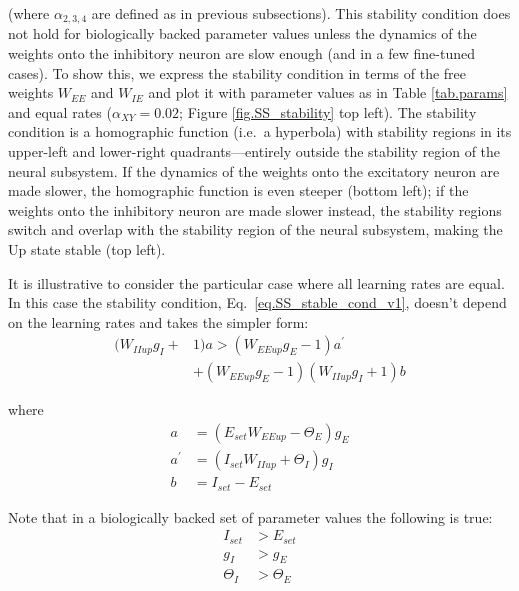 \documentclass[twocolumn]{article}
\newcommand{\EE}{\mathit{EE}}
\newcommand{\IE}{\mathit{IE}}
\newcommand{\II}{\mathit{II}}
\newcommand{\XY}{\mathit{XY}}
\newcommand{\set}{\mathit{set}}
\newcommand{\up}{\mathit{up}}
\begin{document}
\noindent (where $\alpha_{2,3,4}$ are defined as in previous subsections). This stability condition does not hold for biologically backed parameter values unless the dynamics of the weights onto the inhibitory neuron are slow enough (and in a few fine-tuned cases). To show this, we express the stability condition in terms of the free weights $W_{\EE}$ and $W_{\IE}$ and plot it with parameter values as in Table \ref{tab.params} and equal rates ($\alpha_{\XY}=0.02$; Figure \ref{fig.SS_stability} top left). The stability condition is a homographic function (i.e.\ a hyperbola) with stability regions in its upper-left and lower-right quadrants---entirely outside the stability region of the neural subsystem. If the dynamics of the weights onto the excitatory neuron are made slower, the homographic function is even steeper (bottom left); if the weights onto the inhibitory neuron are made slower instead, the stability regions switch and overlap with the stability region of the neural subsystem, making the Up state stable (top left).

It is illustrative to consider the particular case where all learning rates are equal. In this case the stability condition, Eq.\ \ref{eq.SS_stable_cond_v1}, doesn't depend on the learning rates and takes the simpler form:
\begin{equation}
\begin{aligned}
(W_{\II\up} g_I + & 1)a > (W_{\EE\up} g_E - 1)a^\prime \\
& + (W_{\EE\up} g_E - 1)(W_{\II\up} g_I + 1)b
\end{aligned}
\label{eq.SS_stable_cond_v2}
\end{equation}

\noindent where
\begin{displaymath}
\begin{aligned}
a & = (E_{\set} W_{\EE\up} - \Theta_E)g_E \\
a^\prime & = (I_{\set} W_{\II\up} + \Theta_I)g_I \\
b & = I_{\set} - E_{\set}
\end{aligned}
\end{displaymath}

\noindent Note that in a biologically backed set of parameter values the following is true:
\begin{displaymath}
\begin{aligned}
I_{\set} & > E_{\set} \\
g_I & > g_E \\
\Theta_I & > \Theta_E
\end{aligned}
\end{displaymath}
\end{document}
